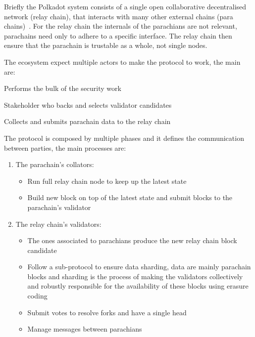 \documentclass[../main.tex]{subfiles}
\begin{document}
Briefly the Polkadot system consists of a single open collaborative decentralised network (relay chain), that interacts with many other external chains (para chains)~\cite{burdges2020overview}. For the relay chain the internals of the parachians are not relevant, parachains need only to adhere to a specific interface. The relay chain then ensure that the parachain is trustable as a whole, not single nodes.

The ecosystem expect multiple actors to make the protocol to work, the main are:
\begin{description}[font=$\bullet$ \scshape\bfseries]
  \item[Validator] Performs the bulk of the security work
  \item[Nonimator] Stakeholder who backs and selects validator candidates
  \item[Collator] Collects and submits parachain data to the relay chain
\end{description}

The protocol is composed by multiple phases and it defines the communication between parties, the main processes are:~\cite{burdges2020overview}

\begin{enumerate}
  \item The parachain's collators:
        \begin{itemize}
                \item Run full relay chain node to keep up the latest state
                \item Build new block on top of the latest state and submit blocks to the parachain's validator
        \end{itemize}
  \item The relay chain's validators:
    \begin{itemize}
      \item The ones associated to parachians produce the new relay chain block candidate
      \item Follow a sub-protocol to ensure data sharding, data are mainly parachain blocks and sharding is the process of making the validators collectively and robustly responsible for the availability of these blocks using erasure coding
      \item Submit votes to resolve forks and have a single head
      \item Manage messages between parachians
    \end{itemize}
\end{enumerate}
\end{document}
